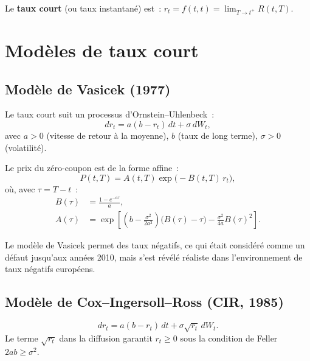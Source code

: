 \begin{definition}
Le \textbf{taux court} (ou taux instantan\'e) est~:
$r_t = f(t,t) = \lim_{T \to t^+} R(t,T)$.
\end{definition}

\section{Mod\`eles de taux court}

\subsection{Mod\`ele de Vasicek (1977)}

\begin{definition}
Le taux court suit un processus d'Ornstein--Uhlenbeck~:
\[
    dr_t = a(b - r_t)\,dt + \sigma\,dW_t,
\]
avec $a > 0$ (vitesse de retour \`a la moyenne), $b$ (taux de long terme),
$\sigma > 0$ (volatilit\'e).
\end{definition}

\begin{theoreme}
\label{thm:vasicek_zc}
Le prix du z\'ero-coupon est de la forme affine~:
\[
    P(t,T) = A(t,T)\exp\!\bigl(-B(t,T)\,r_t\bigr),
\]
o\`u, avec $\tau = T - t$~:
\begin{align}
    B(\tau) &= \frac{1 - e^{-a\tau}}{a}, \\
    A(\tau) &= \exp\!\left[\left(b - \frac{\sigma^2}{2a^2}\right)
    \bigl(B(\tau) - \tau\bigr) - \frac{\sigma^2}{4a}B(\tau)^2\right].
\end{align}
\end{theoreme}

\begin{remarque}
Le mod\`ele de Vasicek permet des taux n\'egatifs, ce qui \'etait
consid\'er\'e comme un d\'efaut jusqu'aux ann\'ees 2010, mais s'est
r\'ev\'el\'e r\'ealiste dans l'environnement de taux n\'egatifs europ\'eens.
\end{remarque}

\subsection{Mod\`ele de Cox--Ingersoll--Ross (CIR, 1985)}

\begin{definition}
\[
    dr_t = a(b - r_t)\,dt + \sigma\sqrt{r_t}\,dW_t.
\]
Le terme $\sqrt{r_t}$ dans la diffusion garantit $r_t \geq 0$ sous la
condition de Feller $2ab \geq \sigma^2$.
\end{definition}

